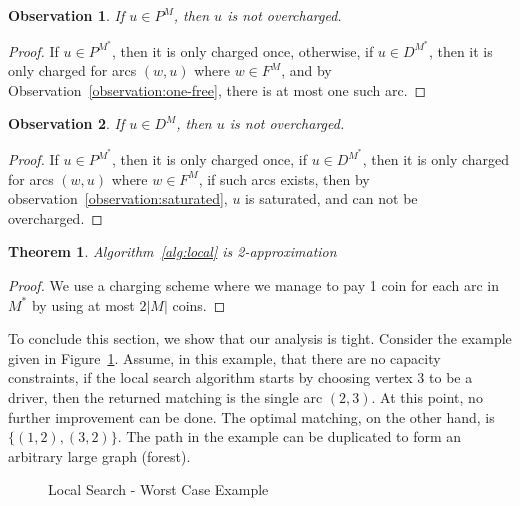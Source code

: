 \documentclass[draft]{article}
\newtheorem{observation}{Observation}
\newtheorem{theorem}{Theorem}
\begin{document}
\begin{observation}
\label{observation:p-not-charged}
If $u \in P^M$, then $u$ is not overcharged.
\end{observation}

\begin{proof}
If $u \in P^{M^*}$, then it is only charged once, otherwise, 
if $u \in D^{M^*}$, then it is only charged for arcs $(w, u)$ where $w \in F^M$,
and by Observation~\ref{observation:one-free}, there is at most one such arc. 
\end{proof}

\begin{observation}
\label{observation:d-not-charged}
If $u \in D^M$, then $u$ is not overcharged.
\end{observation}

\begin{proof}
If $u \in P^{M^*}$, then it is only charged once, 
if $u \in D^{M^*}$, then it is only charged for arcs $(w, u)$ where $w \in F^M$,
if such arcs exists, then by observation~\ref{observation:saturated}, $u$ is saturated, 
and can not be overcharged.
\end{proof}

\begin{theorem}
Algorithm~\ref{alg:local} is 2-approximation
\end{theorem}

\begin{proof}
We use a charging scheme where we manage to pay 1 coin for each arc in $M^*$
by using at most $2|M|$ coins.
\end{proof}


To conclude this section, we show that our analysis is tight.
Consider the example given in Figure~\ref{fig:localtight}.
Assume, in this example, that there are no capacity constraints,
if the local search algorithm starts by choosing vertex $3$ to be a driver, 
then the returned matching is the single arc $(2,3)$.
At this point, no further improvement can be done.
The optimal matching, on the other hand, is $\{(1, 2), (3, 2)\}$. 
The path in the example can be duplicated to form an arbitrary large graph (forest).

\begin{figure} 
\centering
{}
\caption{
\label{fig:localtight}
Local Search - Worst Case Example
}
\end{figure}
\end{document}
